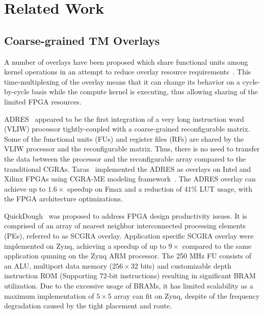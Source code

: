 \section{Related Work}


\subsection{Coarse-grained TM Overlays}
A number of overlays have been proposed which share functional units among kernel operations in an attempt to reduce overlay resource requirements~\cite{severance2013embedded, liu2015quickdough, taras2019impact}.
This time-multiplexing of the overlay means that it can change its behavior on a cycle-by-cycle basis while the compute kernel is executing, thus allowing sharing of the limited FPGA resources.


ADRES~\cite{mei2003adres} appeared to be the first integration of a very long instruction word (VLIW) processor tightly-coupled with a coarse-grained reconfigurable matrix. 
Some of the functional units (FUs) and register files (RFs) are shared by the VLIW processor and the reconfigurable matrix. 
Thus, there is no need to transfer the data between the processor and the reconfigurable array compared to the tranditional CGRAs. 
Taras~\cite{taras2019impact} implemented the ADRES as overlays on Intel and Xilinx FPGAs using CGRA-ME modeling framework~\cite{chin2017cgra}. 
The ADRES overlay can achieve up to $1.6\times$ speedup on Fmax and a reduction of 41\% LUT usage, with the FPGA architecture optimizations. 


QuickDough~\cite{liu2015quickdough} was proposed to address FPGA design productivity issues. 
It is comprised of an array of nearest neighbor interconnected processing elements (PEs), referred to as SCGRA overlay.  
Application specific SCGRA overlay were implemented on Zynq, achieving a speedup of up to $9\times$ compared to the same application qunning on the Zynq ARM processor. 
The 250 MHz FU consists of an ALU, multiport data memory ($256\times$32 bits) and customizable depth instruction ROM (Supporting 72-bit instructions) resulting in significant BRAM utilization. 
Due to the excessive usage of BRAMs, it has limited scalability as a maximum implementation of $5\times$5 array can fit on Zynq, despite of the frequency degradation caused by the tight placement and route. 


